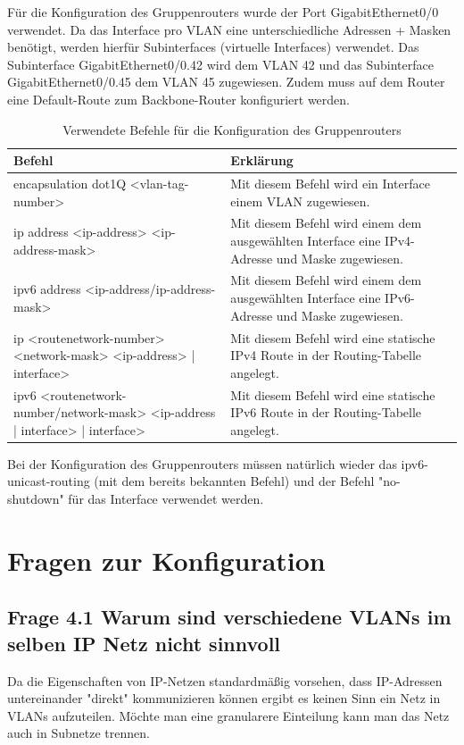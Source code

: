 \documentclass{article}
\begin{document}
Für die Konfiguration des Gruppenrouters wurde der Port GigabitEthernet0/0 verwendet. Da das Interface pro VLAN eine unterschiedliche Adressen + Masken benötigt, werden hierfür Subinterfaces (virtuelle Interfaces) verwendet. Das Subinterface GigabitEthernet0/0.42 wird dem VLAN 42 und das Subinterface GigabitEthernet0/0.45 dem VLAN 45 zugewiesen. Zudem muss auf dem Router eine Default-Route zum Backbone-Router konfiguriert werden.

\begin{table}[htbp]
    \centering
    \begin{tabularx}{\textwidth}{|X|X|}
        \toprule
        \textbf{Befehl} & \textbf{Erklärung} \\
        \midrule
        encapsulation dot1Q <vlan-tag-number> & Mit diesem Befehl wird ein Interface einem VLAN zugewiesen.\\
        \hline
        ip address <ip-address> <ip-address-mask> & Mit diesem Befehl wird einem dem ausgewählten Interface eine IPv4-Adresse und Maske zugewiesen.\\
        \hline
        ipv6 address <ip-address/ip-address-mask> & Mit diesem Befehl wird einem dem ausgewählten Interface eine IPv6-Adresse und Maske zugewiesen.\\
        \hline
        ip <routenetwork-number> <network-mask> <ip-address> | interface> & Mit diesem Befehl wird eine statische IPv4 Route in der Routing-Tabelle angelegt.\\
        \hline
        ipv6 <routenetwork-number/network-mask> <ip-address | interface> | interface> & Mit diesem Befehl wird eine statische IPv6 Route in der Routing-Tabelle angelegt.\\
        \bottomrule
    \end{tabularx}
    \caption{Verwendete Befehle für die Konfiguration des Gruppenrouters}
    \label{tab:commands}
\end{table}
\noindent Bei der Konfiguration des Gruppenrouters müssen natürlich wieder das ipv6-unicast-routing (mit dem bereits bekannten Befehl) und der Befehl "no-shutdown" für das Interface verwendet werden.

\section{Fragen zur Konfiguration}

\subsection*{Frage 4.1 \normalfont Warum sind verschiedene VLANs im selben IP Netz nicht sinnvoll}
Da die Eigenschaften von IP-Netzen standardmäßig vorsehen, dass IP-Adressen untereinander "direkt" kommunizieren können ergibt es keinen Sinn ein Netz in VLANs aufzuteilen. Möchte man eine granularere Einteilung kann man das Netz auch in Subnetze trennen.
\end{document}
